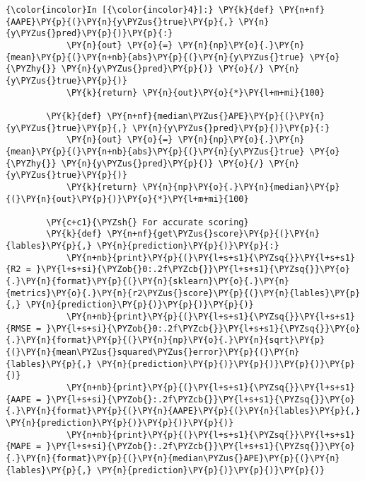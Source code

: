     \begin{Verbatim}[commandchars=\\\{\}]
{\color{incolor}In [{\color{incolor}4}]:} \PY{k}{def} \PY{n+nf}{AAPE}\PY{p}{(}\PY{n}{y\PYZus{}true}\PY{p}{,} \PY{n}{y\PYZus{}pred}\PY{p}{)}\PY{p}{:}
            \PY{n}{out} \PY{o}{=} \PY{n}{np}\PY{o}{.}\PY{n}{mean}\PY{p}{(}\PY{n+nb}{abs}\PY{p}{(}\PY{n}{y\PYZus{}true} \PY{o}{\PYZhy{}} \PY{n}{y\PYZus{}pred}\PY{p}{)} \PY{o}{/} \PY{n}{y\PYZus{}true}\PY{p}{)}
            \PY{k}{return} \PY{n}{out}\PY{o}{*}\PY{l+m+mi}{100}
        
        \PY{k}{def} \PY{n+nf}{median\PYZus{}APE}\PY{p}{(}\PY{n}{y\PYZus{}true}\PY{p}{,} \PY{n}{y\PYZus{}pred}\PY{p}{)}\PY{p}{:}
            \PY{n}{out} \PY{o}{=} \PY{n}{np}\PY{o}{.}\PY{n}{mean}\PY{p}{(}\PY{n+nb}{abs}\PY{p}{(}\PY{n}{y\PYZus{}true} \PY{o}{\PYZhy{}} \PY{n}{y\PYZus{}pred}\PY{p}{)} \PY{o}{/} \PY{n}{y\PYZus{}true}\PY{p}{)}
            \PY{k}{return} \PY{n}{np}\PY{o}{.}\PY{n}{median}\PY{p}{(}\PY{n}{out}\PY{p}{)}\PY{o}{*}\PY{l+m+mi}{100}
        
        \PY{c+c1}{\PYZsh{} For accurate scoring}
        \PY{k}{def} \PY{n+nf}{get\PYZus{}score}\PY{p}{(}\PY{n}{lables}\PY{p}{,} \PY{n}{prediction}\PY{p}{)}\PY{p}{:}    
            \PY{n+nb}{print}\PY{p}{(}\PY{l+s+s1}{\PYZsq{}}\PY{l+s+s1}{R2 = }\PY{l+s+si}{\PYZob{}0:.2f\PYZcb{}}\PY{l+s+s1}{\PYZsq{}}\PY{o}{.}\PY{n}{format}\PY{p}{(}\PY{n}{sklearn}\PY{o}{.}\PY{n}{metrics}\PY{o}{.}\PY{n}{r2\PYZus{}score}\PY{p}{(}\PY{n}{lables}\PY{p}{,} \PY{n}{prediction}\PY{p}{)}\PY{p}{)}\PY{p}{)}
            \PY{n+nb}{print}\PY{p}{(}\PY{l+s+s1}{\PYZsq{}}\PY{l+s+s1}{RMSE = }\PY{l+s+si}{\PYZob{}0:.2f\PYZcb{}}\PY{l+s+s1}{\PYZsq{}}\PY{o}{.}\PY{n}{format}\PY{p}{(}\PY{n}{np}\PY{o}{.}\PY{n}{sqrt}\PY{p}{(}\PY{n}{mean\PYZus{}squared\PYZus{}error}\PY{p}{(}\PY{n}{lables}\PY{p}{,} \PY{n}{prediction}\PY{p}{)}\PY{p}{)}\PY{p}{)}\PY{p}{)}
            \PY{n+nb}{print}\PY{p}{(}\PY{l+s+s1}{\PYZsq{}}\PY{l+s+s1}{AAPE = }\PY{l+s+si}{\PYZob{}:.2f\PYZcb{}}\PY{l+s+s1}{\PYZsq{}}\PY{o}{.}\PY{n}{format}\PY{p}{(}\PY{n}{AAPE}\PY{p}{(}\PY{n}{lables}\PY{p}{,} \PY{n}{prediction}\PY{p}{)}\PY{p}{)}\PY{p}{)}
            \PY{n+nb}{print}\PY{p}{(}\PY{l+s+s1}{\PYZsq{}}\PY{l+s+s1}{MAPE = }\PY{l+s+si}{\PYZob{}:.2f\PYZcb{}}\PY{l+s+s1}{\PYZsq{}}\PY{o}{.}\PY{n}{format}\PY{p}{(}\PY{n}{median\PYZus{}APE}\PY{p}{(}\PY{n}{lables}\PY{p}{,} \PY{n}{prediction}\PY{p}{)}\PY{p}{)}\PY{p}{)}
\end{Verbatim}


